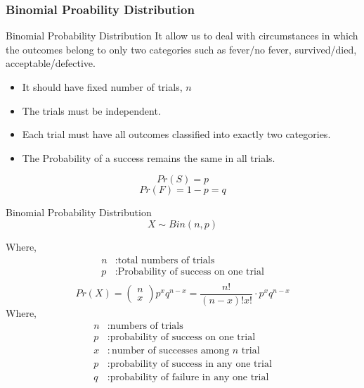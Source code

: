 \documentclass{beamer}
\begin{document}
\subsubsection{Binomial Proability Distribution}
\begin{frame}{Binomial Probability Distribution}
It allow us to deal with circumstances in which the outcomes belong to only two categories such as fever/no fever, survived/died, acceptable/defective. \vspace{0.2cm}
\begin{itemize}
    \item It should have fixed number of trials, $n$
    \item The trials must be independent.
    \item Each trial must have all outcomes classified into exactly two categories.
    \item The Probability of a success remains the same in all trials. 
\end{itemize}\vspace{0.3cm}
    \begin{equation}
        Pr(S)=p
    \end{equation}
    \begin{equation}
        Pr(F)= 1-p= q
    \end{equation}
    \end{frame}

    \begin{frame}{Binomial Probability Distribution}
        \begin{equation}
            X \sim Bin(n,p)
        \end{equation}

            Where,
    \[
\begin{aligned}
n & : \text{total numbers of trials}\\
p & : \text{Probability of success on one trial}\\

\end{aligned}
\]
\begin{equation}
Pr(X)=
    \begin{pmatrix}
        n\\
        x
        
    \end{pmatrix}p^x q^{n-x}=\frac{n!}{(n-x)!x!}\cdot p^x q^{n-x}
\end{equation}
            Where,
    \[
\begin{aligned}
n & : \text{numbers of trials}\\
p & : \text{probability of success on one trial}\\
x & : \text{number of successes among $n$ trial}\\
p & : \text{probability of success in any one trial}\\
q & : \text{probability of failure in any one trial}\\
\end{aligned}
\]
    \end{frame}
\end{document}
